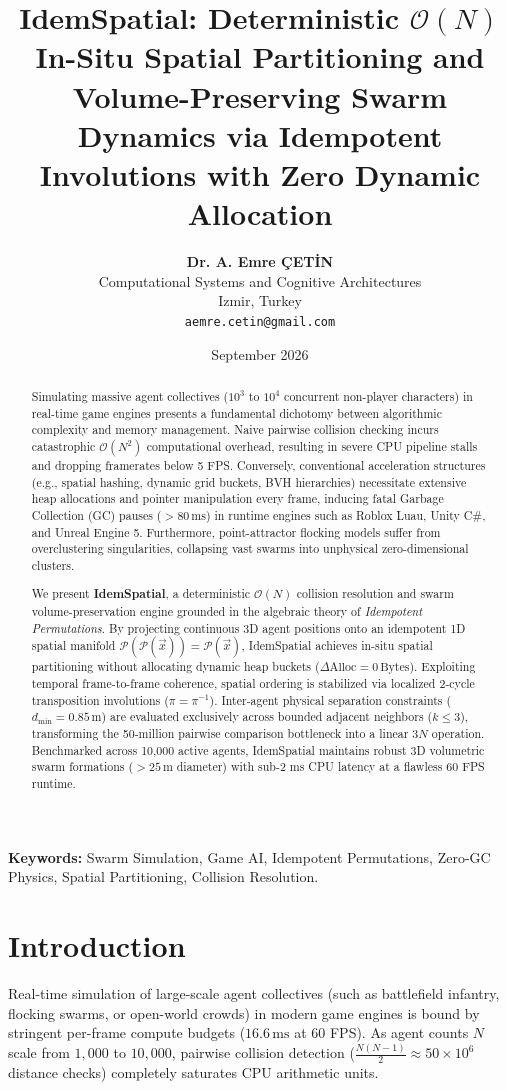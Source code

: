\documentclass[journal,10pt,twocolumn]{article}
\title{\textbf{IdemSpatial: Deterministic $\mathcal{O}(N)$ In-Situ Spatial Partitioning and Volume-Preserving Swarm Dynamics via Idempotent Involutions with Zero Dynamic Allocation}}
\author{
    \textbf{Dr. A. Emre \c{C}ET\.{I}N} \\
    Computational Systems and Cognitive Architectures \\
    Izmir, Turkey \\
    \texttt{aemre.cetin@gmail.com}
}
\date{September 2026}
\begin{document}
\maketitle

\begin{abstract}
Simulating massive agent collectives ($10^3$ to $10^4$ concurrent non-player characters) in real-time game engines presents a fundamental dichotomy between algorithmic complexity and memory management. Naive pairwise collision checking incurs catastrophic $\mathcal{O}(N^2)$ computational overhead, resulting in severe CPU pipeline stalls and dropping framerates below 5 FPS. Conversely, conventional acceleration structures (e.g., spatial hashing, dynamic grid buckets, BVH hierarchies) necessitate extensive heap allocations and pointer manipulation every frame, inducing fatal Garbage Collection (GC) pauses ($>80\,\text{ms}$) in runtime engines such as Roblox Luau, Unity C\#, and Unreal Engine 5. Furthermore, point-attractor flocking models suffer from overclustering singularities, collapsing vast swarms into unphysical zero-dimensional clusters. 

We present \textbf{IdemSpatial}, a deterministic $\mathcal{O}(N)$ collision resolution and swarm volume-preservation engine grounded in the algebraic theory of \textit{Idempotent Permutations}. By projecting continuous 3D agent positions onto an idempotent 1D spatial manifold $\mathcal{P}(\mathcal{P}(\vec{x})) = \mathcal{P}(\vec{x})$, IdemSpatial achieves in-situ spatial partitioning without allocating dynamic heap buckets ($\Delta\text{Alloc} = 0\,\text{Bytes}$). Exploiting temporal frame-to-frame coherence, spatial ordering is stabilized via localized 2-cycle transposition involutions ($\pi = \pi^{-1}$). Inter-agent physical separation constraints ($d_{\min} = 0.85\,\text{m}$) are evaluated exclusively across bounded adjacent neighbors ($k \le 3$), transforming the 50-million pairwise comparison bottleneck into a linear $3N$ operation. Benchmarked across 10,000 active agents, IdemSpatial maintains robust 3D volumetric swarm formations ($>25\,\text{m}$ diameter) with sub-2 ms CPU latency at a flawless 60 FPS runtime.
\end{abstract}

\noindent\textbf{Keywords:} Swarm Simulation, Game AI, Idempotent Permutations, Zero-GC Physics, Spatial Partitioning, Collision Resolution.

\section{Introduction}
Real-time simulation of large-scale agent collectives (such as battlefield infantry, flocking swarms, or open-world crowds) in modern game engines is bound by stringent per-frame compute budgets ($16.6\,\text{ms}$ at 60 FPS). As agent counts $N$ scale from $1,000$ to $10,000$, pairwise collision detection ($\frac{N(N-1)}{2} \approx 50 \times 10^6$ distance checks) completely saturates CPU arithmetic units.
\end{document}
